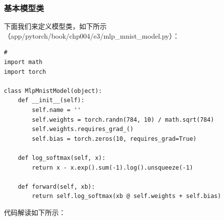 \documentclass[UTF8]{article}
\begin{document}
\subsubsection{基本模型类}
下面我们来定义模型类，如下所示（app/pytorch/book/chp004/e3/mlp\_mnist\_model.py）：
\begin{lstlisting}
#
import math
import torch

class MlpMnistModel(object):
    def __init__(self):
        self.name = ''
        self.weights = torch.randn(784, 10) / math.sqrt(784)
        self.weights.requires_grad_()
        self.bias = torch.zeros(10, requires_grad=True)

    def log_softmax(self, x):
        return x - x.exp().sum(-1).log().unsqueeze(-1)

    def forward(self, xb):
        return self.log_softmax(xb @ self.weights + self.bias)
\end{lstlisting}
代码解读如下所示：
\end{document}
